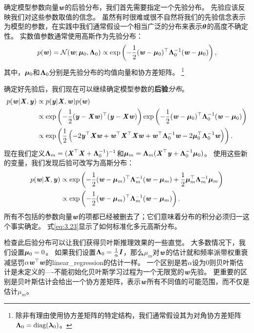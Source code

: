 
确定模型参数向量$\Vw$的后验分布，我们首先需要指定一个先验分布。
先验应该反映我们对这些参数取值的信念。
虽然有时很难或很不自然将我们的先验信念表示为模型的参数，在实践中我们通常假设一个相当广泛的分布来表示$\Vtheta$的高度不确定性。
实数值参数通常使用高斯作为先验分布：
\begin{equation}
    p(\Vw) = \mathcal{N}( \Vw; \Vmu_0, \VLambda_0 ) 
    \propto \exp\left( 
    -\frac{1}{2}( \Vw-\Vmu_0 )^\Tsp \VLambda_0^{-1} ( \Vw-\Vmu_0 )
    \right),
\end{equation}
其中，$\Vmu_0$和$\VLambda_0$分别是先验分布的均值向量和协方差矩阵。
\footnote{除非有理由使用协方差矩阵的特定结构，我们通常假设其为对角协方差矩阵
$\VLambda_0=\text{diag}(\Vlambda_0)$。
}

确定好先验后，我们现在可以继续确定模型参数的\textbf{后验}\emph{分布}。
\begin{align}
    p(\Vw | \MX, \Vy) &\propto p(\Vy | \MX, \Vw) p(\Vw) \\
    & \propto 
        \exp\left( 
            -\frac{1}{2} ( \Vy - \MX\Vw )^\Tsp( \Vy - \MX\Vw )
        \right)
        \exp\left(
    -\frac{1}{2} ( \Vw - \Vmu_0)^\Tsp \VLambda_0^{-1} ( \Vw - \Vmu_0)
        \right) \\
    & \propto \exp
    \left(
    \frac{1}{2}\left(
    -2\Vy^\Tsp\MX\Vw + \Vw^\Tsp\MX^\Tsp\MX\Vw + \Vw^\Tsp\VLambda_0^{-1}\Vw - 
    2\Vmu_0^\Tsp \VLambda_0^{-1}\Vw
    \right)
    \right).
\end{align}
现在我们定义$\VLambda_m = (\MX^\Tsp\MX + \VLambda_0^{-1})^{-1}$和$\Vmu_m = \VLambda_m ( \MX^\Tsp \Vy + \VLambda_0^{-1}\Vmu_0 )$。
使用这些新的变量，我们发现后验可改写为高斯分布：
\begin{align}
    p(\Vw | \MX, \Vy) &\propto \exp \left(
    -\frac{1}{2} (\Vw - \Vmu_m )^\Tsp \VLambda_m^{-1}  (\Vw - \Vmu_m ) 
    + \frac{1}{2} \Vmu_m^\Tsp \VLambda_m^{-1}  \Vmu_m 
    \right) \\
    &\propto \exp\left(
    -\frac{1}{2} (\Vw - \Vmu_m)^\Tsp \VLambda_m^{-1} (\Vw - \Vmu_m)
    \right).
\end{align}
所有不包括的参数向量$\Vw$的项都已经被删去了；它们意味着分布的积分必须归一这个事实确定。
式\ref{eq:3.23}显示了如何标准化多元高斯分布。


检查此后验分布可以让我们获得贝叶斯推理效果的一些直觉。
大多数情况下，我们设置$\Vmu_0 = 0$。
如果我们设置$\VLambda_0 = \frac{1}{\alpha}\MI$，那么$\mu_m$对$\Vw$的估计就和频率派带权重衰减惩罚$\alpha\Vw^\Tsp\Vw$的\gls{linear_regression}的估计一样。
一个区别是若$\alpha$设为$0$则贝叶斯估计是未定义的----不能初始化贝叶斯学习过程为一个无限宽的$\Vw$先验。
更重要的区别是贝叶斯估计会给出一个协方差矩阵，表示$\Vw$所有不同值的可能范围，而不仅是估计$\mu_m$。

